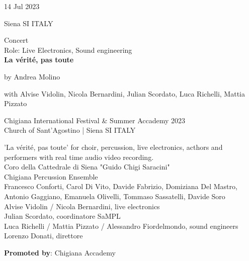 \documentclass[7pt,a4paper]{article}
\begin{document}
\begin{mdframed}[
    backgroundcolor=white,
    linecolor=white,
    linewidth=0pt,
    innerleftmargin=6pt,
    innerrightmargin=6pt,
    innertopmargin=6pt,
    innerbottommargin=6pt,
    skipabove=0pt,
    skipbelow=0pt
]

\begin{minipage}[t]{0.28\textwidth}

14 Jul 2023

\scriptsize Siena SI ITALY


\end{minipage}
\begin{minipage}[t]{0.68\textwidth}
\small Concert
\\\scriptsize Role: Live Electronics, Sound engineering
\\ \normalsize \textbf{La vérité, pas toute}
\par\scriptsize by Andrea Molino
\par\scriptsize with Alvise Vidolin, Nicola Bernardini, Julian Scordato, Luca Richelli, Mattia Pizzato
\vspace{0.25cm}



\small Chigiana International Festival \& Summer Accademy 2023\\Church of Sant'Agostino  | \scriptsize Siena SI ITALY

\vspace{0.1cm}
\scriptsize

'La vérité, pas toute' for choir, percussion, live electronics, acthors and performers with real time audio video recording.\\Coro della Cattedrale di Siena "Guido Chigi Saracini"\\Chigiana Percussion Ensemble\\Francesco Conforti, Carol Di Vito, Davide Fabrizio, Domiziana Del Mastro, Antonio Gaggiano, Emanuela Olivelli, Tommaso Sassatelli, Davide Soro\\Alvise Vidolin / Nicola Bernardini, live electronics\\Julian Scordato, coordinatore SaMPL\\Luca Richelli / Mattia Pizzato / Alessandro Fiordelmondo, sound engineers\\Lorenzo Donati, direttore

\vspace{0.1cm}
\par \textbf{Promoted by}: Chigiana Accademy
\end{minipage}
\vspace{0.25cm}
\end{mdframed}
\end{document}
